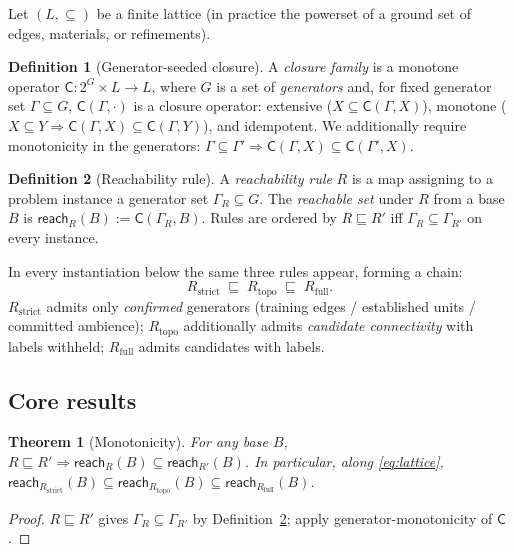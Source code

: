 \documentclass[11pt,a4paper]{article}
\theoremstyle{definition}
\newtheorem{definition}{Definition}
\theoremstyle{plain}
\newtheorem{theorem}{Theorem}
\theoremstyle{remark}
\newcommand{\Cl}{\mathsf{C}}
\newcommand{\Rstrict}{R_{\mathrm{strict}}}
\newcommand{\Rtopo}{R_{\mathrm{topo}}}
\newcommand{\Rfull}{R_{\mathrm{full}}}
\newcommand{\reach}{\mathsf{reach}}
\begin{document}
Let $(L,\subseteq)$ be a finite lattice (in practice the powerset of a ground set
of edges, materials, or refinements).

\begin{definition}[Generator-seeded closure]
A \emph{closure family} is a monotone operator
$\Cl : 2^{G}\times L \to L$, where $G$ is a set of \emph{generators} and, for
fixed generator set $\Gamma\subseteq G$, $\Cl(\Gamma,\cdot)$ is a closure
operator: extensive ($X\subseteq \Cl(\Gamma,X)$), monotone
($X\subseteq Y \Rightarrow \Cl(\Gamma,X)\subseteq\Cl(\Gamma,Y)$), and idempotent.
We additionally require monotonicity in the generators:
$\Gamma\subseteq\Gamma' \Rightarrow \Cl(\Gamma,X)\subseteq\Cl(\Gamma',X)$.
\end{definition}

\begin{definition}[Reachability rule]
\label{def:rule}
A \emph{reachability rule} $R$ is a map assigning to a problem instance a
generator set $\Gamma_R\subseteq G$. The \emph{reachable set} under $R$ from a
base $B$ is $\reach_R(B) := \Cl(\Gamma_R, B)$. Rules are ordered by
$R\sqsubseteq R'$ iff $\Gamma_R\subseteq\Gamma_{R'}$ on every instance.
\end{definition}

In every instantiation below the same three rules appear, forming a chain:
\begin{equation}
  \Rstrict \;\sqsubseteq\; \Rtopo \;\sqsubseteq\; \Rfull .
  \label{eq:lattice}
\end{equation}
$\Rstrict$ admits only \emph{confirmed} generators (training edges / established
units / committed ambience); $\Rtopo$ additionally admits \emph{candidate
connectivity} with labels withheld; $\Rfull$ admits candidates with labels.

\subsection{Core results}

\begin{theorem}[Monotonicity]
\label{thm:mono}
For any base $B$, $R\sqsubseteq R' \Rightarrow \reach_R(B)\subseteq\reach_{R'}(B)$.
In particular, along \eqref{eq:lattice},
$\reach_{\Rstrict}(B)\subseteq\reach_{\Rtopo}(B)\subseteq\reach_{\Rfull}(B)$.
\end{theorem}
\begin{proof}
$R\sqsubseteq R'$ gives $\Gamma_R\subseteq\Gamma_{R'}$ by
Definition~\ref{def:rule}; apply generator-monotonicity of $\Cl$.
\end{proof}
\end{document}
